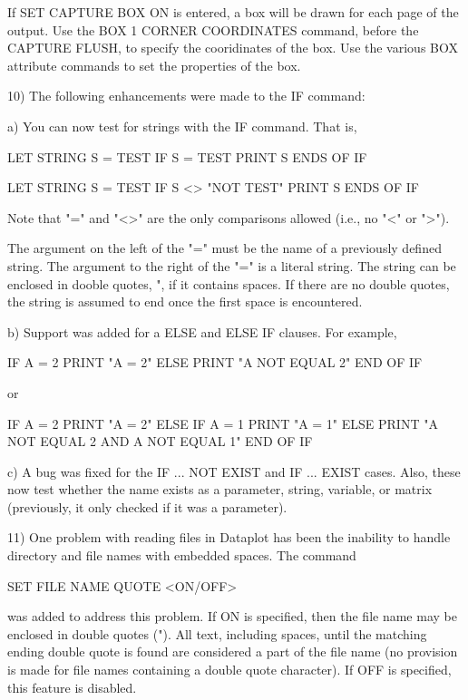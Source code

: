 {    If SET CAPTURE BOX ON is entered, a box will be drawn for each
    page of the output.  Use the BOX 1 CORNER COORDINATES command,
    before the CAPTURE FLUSH, to specify the cooridinates of the
    box.  Use the various BOX attribute commands to set the
    properties of the box.

10) The following enhancements were made to the IF command:

    a) You can now test for strings with the IF command.  That is,

         LET STRING S = TEST
         IF S = TEST
            PRINT S
         ENDS OF IF
   
         LET STRING S = TEST
         IF S <> "NOT TEST"
            PRINT S
         ENDS OF IF
   
       Note that "=" and "<>" are the only comparisons allowed (i.e.,
       no "<" or ">").
   
       The argument on the left of the "=" must be the name of a
       previously defined string.  The argument to the right of the
       "=" is a literal string.  The string can be enclosed in
       dooble quotes, ", if it contains spaces.  If there are no
       double quotes, the string is assumed to end once the first
       space is encountered.
   
    b) Support was added for a ELSE and ELSE IF clauses.  For 
       example,

          IF A = 2
             PRINT "A = 2"
          ELSE
             PRINT "A NOT EQUAL 2"
          END OF IF

       or

          IF A = 2
             PRINT "A = 2"
          ELSE IF A = 1
             PRINT "A = 1"
          ELSE
             PRINT "A NOT EQUAL 2 AND A NOT EQUAL 1"
          END OF IF

    c) A bug was fixed for the IF ... NOT EXIST and IF ... EXIST
       cases.  Also, these now test whether the name exists as a
       parameter, string, variable, or matrix (previously, it only
       checked if it was a parameter).

11) One problem with reading files in Dataplot has been the
    inability to handle directory and file names with embedded
    spaces.  The command

      SET FILE NAME QUOTE <ON/OFF>

    was added to address this problem.  If ON is specified,
    then the file name may be enclosed in double quotes (").
    All text, including spaces, until the matching ending double
    quote is found are considered a part of the file name (no
    provision is made for file names containing a double quote
    character).  If OFF is specified, this feature is disabled.

}
